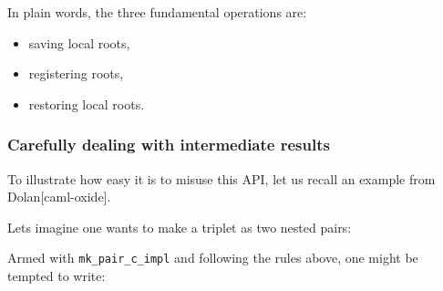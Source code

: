 \documentclass[a4paper]{easychair}
\begin{document}
\begin{Shaded}
\begin{Highlighting}[]
\NormalTok{\{}


  
\NormalTok{\}}
\end{Highlighting}
\end{Shaded}

In plain words, the three fundamental operations are:

\begin{itemize}
\tightlist
\item
  saving local roots,
\item
  registering roots,
\item
  restoring local roots.
\end{itemize}

\hypertarget{carefully-dealing-with-intermediate-results}{%
\subsubsection{Carefully dealing with intermediate
results}\label{carefully-dealing-with-intermediate-results}}

To illustrate how easy it is to misuse this API, let us recall an
example from Dolan{[}caml-oxide{]}.

Lets imagine one wants to make a triplet as two nested pairs:

\begin{Shaded}
\begin{Highlighting}[]
\end{Highlighting}
\end{Shaded}

Armed with \texttt{mk\_pair\_c\_impl} and following the rules above, one
might be tempted to write:
\end{document}
